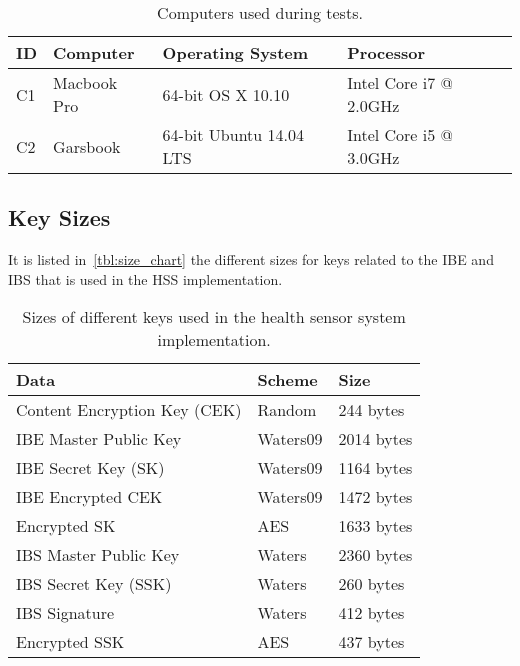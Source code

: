 \begin{table}[h]
  \begin{tabular}{llll}
  ID      & Computer                  & Operating System          & Processor                    \\ \hline
  C1      & Macbook Pro               & 64-bit OS X 10.10         & Intel Core i7 @ 2.0GHz       \\ %
  C2      & Garsbook                  & 64-bit Ubuntu 14.04 LTS   & Intel Core i5 @ 3.0GHz       \\ %
  \end{tabular}
  \caption{Computers used during tests.}
  \label{tbl:target_computers}
\end{table}

\subsection{Key Sizes}
It is listed in~\autoref{tbl:size_chart} the different sizes for keys related to the \gls{IBE} and \gls{IBS} that is used in the \gls{HSS} implementation.

\begin{table}[h]
  \begin{tabular}{lll}
  Data                            & Scheme          & Size              \\ \hline
  Content Encryption Key (CEK)    & Random          & 244 bytes         \\ %
  IBE Master Public Key           & Waters09        & 2014 bytes        \\ %
  IBE Secret Key (SK)             & Waters09        & 1164 bytes        \\ %
  IBE Encrypted CEK               & Waters09        & 1472 bytes        \\ %
  Encrypted SK                    & AES             & 1633 bytes        \\ %
  IBS Master Public Key           & Waters          & 2360 bytes        \\ %
  IBS Secret Key (SSK)            & Waters          & 260 bytes         \\ %
  IBS Signature                   & Waters          & 412 bytes         \\ %
  Encrypted SSK                   & AES             & 437 bytes         \\ %
  \end{tabular}
  \caption{Sizes of different keys used in the health sensor system implementation.}
  \label{tbl:size_chart}
\end{table}


